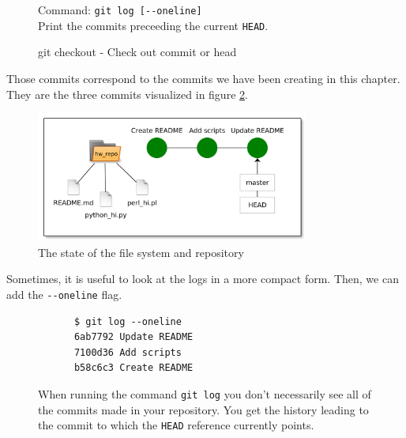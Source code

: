 \documentclass[../main/git_course_main.tex]{subfiles}
\begin{document}
	\begin{figure}[h!]
		\begin{bluebox}
			Command: \verb$git log [--oneline]$ \\
			
			Print the commits preceeding the current \verb$HEAD$.
		\end{bluebox}
		\label{command:diff}
		\caption{git checkout - Check out commit or head}
	\end{figure}
	
	Those commits correspond to the commits we have been creating in this chapter.
	They are the three commits visualized in figure \ref{fig:third_commit_chapter3}.
	
	\begin{figure}[h!]
		\centering
		\includegraphics[width=0.8\textwidth]{../visualizations/chapter2/c26_repo_third_commit.pdf}
		\caption{The state of the file system and repository}
		\label{fig:third_commit_chapter3}
	\end{figure}
	
	Sometimes, it is useful to look at the logs in a more compact form. Then, we can add the \verb$--oneline$ flag.
	
	\begin{codebox}
		\begin{lstlisting}
			$ git log --oneline
			6ab7792 Update README
			7100d36 Add scripts
			b58c6c3 Create README
		\end{lstlisting}
	\end{codebox}
	
	\begin{figure}[h!]
		\begin{redbox}
			When running the command \verb$git log$ you don't necessarily see all of the commits made in your repository. You get the history leading to the commit to which the \verb$HEAD$ reference currently points.
		\end{redbox}
	\end{figure}
	
\end{document}
